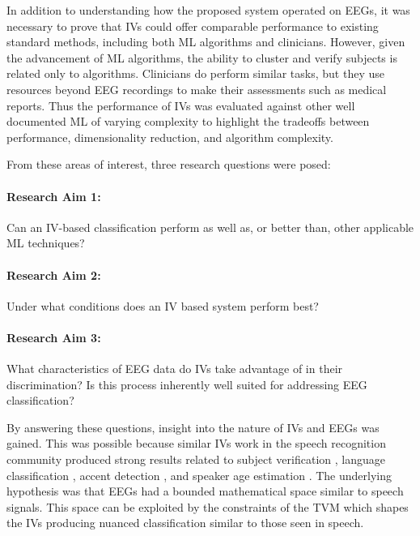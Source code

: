 In addition to understanding how the proposed system operated on \acp{EEG}, it was necessary to prove that \acp{IV} could offer comparable performance to existing standard methods, including both \ac{ML} algorithms and clinicians. However, given the advancement of \ac{ML} algorithms, the ability to cluster and verify subjects is related only to algorithms. Clinicians do perform similar tasks, but they use resources beyond \ac{EEG} recordings to make their assessments such as medical reports. Thus the performance of \acp{IV} was evaluated against other well documented \ac{ML} of varying complexity to highlight the tradeoffs between performance, dimensionality reduction, and algorithm complexity.

From these areas of interest, three research questions were posed:

\paragraph*{Research Aim 1:} Can an \ac{IV}-based classification perform as well as, or better than, other applicable \ac{ML} techniques?
\paragraph*{Research Aim 2:} Under what conditions does an \ac{IV} based system perform best?
\paragraph*{Research Aim 3:} What characteristics of \ac{EEG} data do \acp{IV} take advantage of in their discrimination? Is this process inherently well suited for addressing \ac{EEG} classification?
\bigskip

By answering these questions, insight into the nature of \acp{IV} and \acp{EEG} was gained. This was possible because similar \acp{IV} work in the speech recognition community produced strong results related to subject verification \cite{Kenny2015}, language classification \cite{Li2013a}, accent detection \cite{Behravan2016}, and speaker age estimation \cite{Bahari2012}. The underlying hypothesis was that \acp{EEG} had a bounded mathematical space similar to speech signals. This space can be exploited by the constraints of the \ac{TVM} which shapes the \acp{IV} producing nuanced classification similar to those seen in speech.


